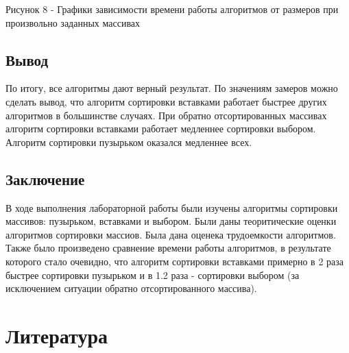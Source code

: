 \documentclass[14pt, a4paper]{extarticle}
\begin{document}
	 \par
	 Рисунок 8 -  Графики зависимости времени работы алгоритмов от размеров при произвольно заданных массивах
	 
	 \subsection*{Вывод}
	 По итогу, все алгоритмы дают верный результат. По значениям замеров можно сделать вывод, что алгоритм сортировки вставками работает быстрее других алгоритмов в большинстве случаях. При обратно отсортированных массивах алгоритм сортировки вставками работает медленнее сортировки выбором. Алгоритм сортировки пузырьком оказался медленнее всех.  
	
	
	\clearpage
	\subsection*{Заключение}
	В ходе выполнения лабораторной работы были изучены алгоритмы сортировки массивов: пузырьком, вставками и выбором. Были даны теоритические оценки алгоритмов сортировки массиов. Была дана оценека трудоемкости алгоритмов. Также было произведено сравнение времени работы алгоритмов, в результате которого стало очевидно, что алгоритм сортировки вставками примерно в 2 раза быстрее сортировки пузырьком и в 1.2 раза - сортировки выбором (за исключением ситуации обратно отсортированного массива).
	
	\newpage	
	\section*{Литература}
		
\end{document}
